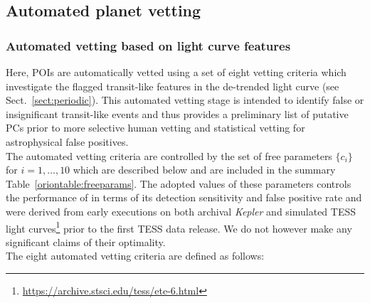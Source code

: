 \subsection{Automated planet vetting} \label{sect:vetting}
\subsubsection{Automated vetting based on light curve features} \label{sect:autovetting}
Here, POIs are automatically vetted using a set of eight vetting criteria which investigate
the flagged transit-like features in the de-trended light curve (see Sect.~\ref{sect:periodic}).
This automated vetting stage is intended to identify false or insignificant transit-like events
and thus provides a preliminary list of putative PCs prior to more selective human vetting
and statistical vetting for astrophysical false positives. \\

The automated vetting criteria are controlled by the set of free parameters
$\{c_i\}$ for $i=1,\dots,10$ which are described below and are included in the
summary Table~\ref{oriontable:freeparams}.
The adopted values of these parameters controls the performance of \pipeline{} in terms of its
detection sensitivity and false positive rate and were derived
from early \pipeline{} executions on both archival \emph{Kepler} and simulated TESS light
curves\footnote{\url{https://archive.stsci.edu/tess/ete-6.html}} prior to the first TESS data
release. We do not however make any significant claims of their optimality. \\

The eight automated vetting criteria are defined as follows:

